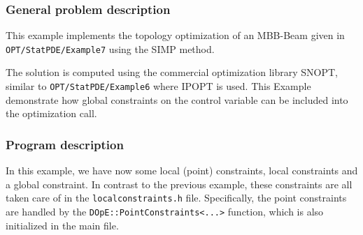 \subsubsection{General problem description}
This example implements the topology optimization of an MBB-Beam given in \\
\texttt{OPT/StatPDE/Example7} using the SIMP method.

The solution is computed using the commercial optimization library SNOPT, similar 
to \texttt{OPT/StatPDE/Example6} where IPOPT is used. 
This Example demonstrate how global constraints on
the control variable can be included into the optimization call.

\subsubsection{Program description}
In this example, we have now some local (point) constraints, local constraints and a global
constraint. In contrast to the previous example, these 
constraints are all taken care of in the 
\texttt{localconstraints.h} file. 
Specifically, the point constraints are handled by the 
\texttt{DOpE::PointConstraints<...>} function, which is also initialized 
in the main file. 


